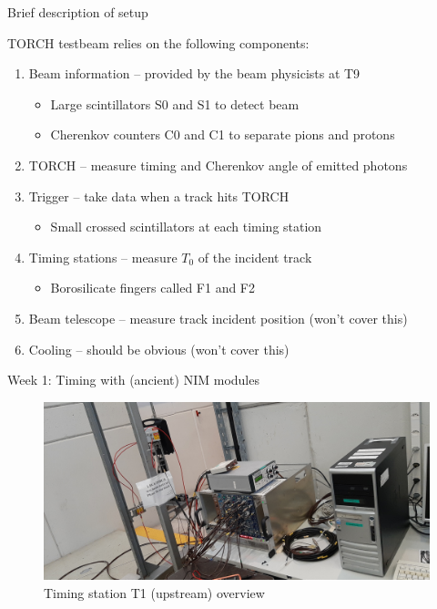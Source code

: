 \documentclass{beamer}
\begin{document}
\begin{frame}{Brief description of setup}
  \begin{center}
    \large
    TORCH testbeam relies on the following components:
  \end{center}
  \begin{enumerate}
    \setlength\itemsep{0.9em}
    \item{Beam information -- provided by the beam physicists at T9}
    \begin{itemize}
      \item{Large scintillators S0 and S1 to detect beam}
      \item{Cherenkov counters C0 and C1 to separate pions and protons}
    \end{itemize}
    \item{TORCH -- measure timing and Cherenkov angle of emitted photons}
    \item{Trigger -- take data when a track hits TORCH}
    \begin{itemize}
      \item{Small crossed scintillators at each timing station}
    \end{itemize}
    \item{Timing stations -- measure $T_0$ of the incident track}
    \begin{itemize}
      \item{Borosilicate fingers called F1 and F2}
    \end{itemize}
    \item{Beam telescope -- measure track incident position (won't cover this)}
    \item{Cooling -- should be obvious (won't cover this)}
  \end{enumerate}
\end{frame}

\begin{frame}{Week 1: Timing with (ancient) NIM modules}
  \begin{figure}
    \centering
    \includegraphics[width = 1.0\textwidth]{Plots/T1_overview.jpg}
    \caption{Timing station T1 (upstream) overview}
  \end{figure}
\end{frame}
\end{document}
